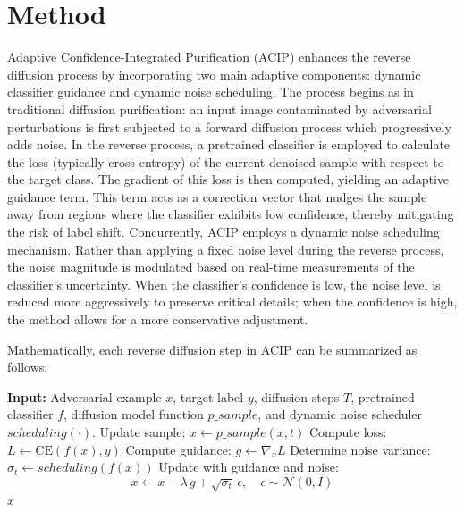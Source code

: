 \documentclass{article} %
\begin{document}
\section{Method}
\label{sec:method}
Adaptive Confidence-Integrated Purification (ACIP) enhances the reverse diffusion process by incorporating two main adaptive components: dynamic classifier guidance and dynamic noise scheduling. The process begins as in traditional diffusion purification: an input image contaminated by adversarial perturbations is first subjected to a forward diffusion process which progressively adds noise. In the reverse process, a pretrained classifier is employed to calculate the loss (typically cross-entropy) of the current denoised sample with respect to the target class. The gradient of this loss is then computed, yielding an adaptive guidance term. This term acts as a correction vector that nudges the sample away from regions where the classifier exhibits low confidence, thereby mitigating the risk of label shift. Concurrently, ACIP employs a dynamic noise scheduling mechanism. Rather than applying a fixed noise level during the reverse process, the noise magnitude is modulated based on real-time measurements of the classifier's uncertainty. When the classifier's confidence is low, the noise level is reduced more aggressively to preserve critical details; when the confidence is high, the method allows for a more conservative adjustment.

Mathematically, each reverse diffusion step in ACIP can be summarized as follows:

\begin{algorithm}[H]
\caption{Adaptive Confidence-Integrated Purification}
\begin{algorithmic}
  \State \textbf{Input:} Adversarial example $x$, target label $y$, diffusion steps $T$, pretrained classifier $f$, diffusion model function $p\_sample$, and dynamic noise scheduler $scheduling(\cdot)$.
    \State Update sample: $x \leftarrow p\_sample(x,t)$
    \State Compute loss: $L \leftarrow \text{CE}(f(x), y)$
    \State Compute guidance: $g \leftarrow \nabla_x L$
    \State Determine noise variance: $\sigma_t \leftarrow scheduling(f(x))$
    \State Update with guidance and noise: 
    \[
      x \leftarrow x - \lambda\,g + \sqrt{\sigma_t}\,\epsilon, \quad \epsilon \sim \mathcal{N}(0,I)
    \]
  \EndFor
  \State \Return $x$
\end{algorithmic}
\end{algorithm}
\end{document}
